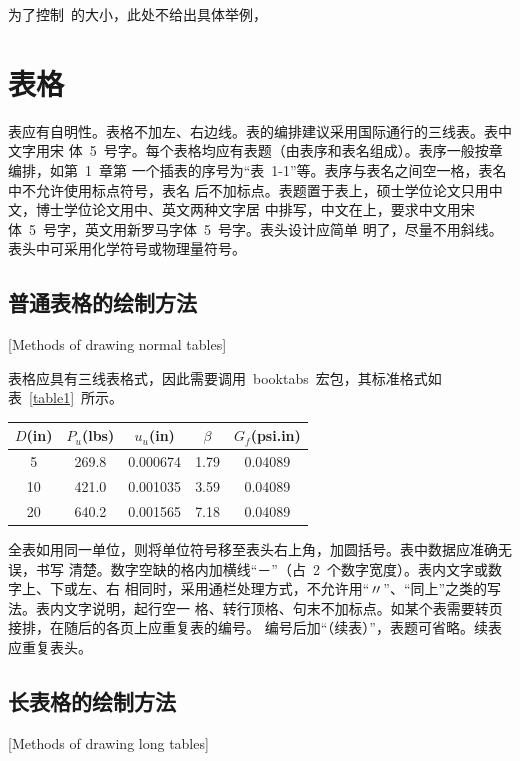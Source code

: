 为了控制\heuthesis\ 的大小，此处不给出具体举例，

\section{表格}

表应有自明性。表格不加左、右边线。表的编排建议采用国际通行的三线表。表中文字用宋
体~5~号字。每个表格均应有表题（由表序和表名组成）。表序一般按章编排，如第~1~章第
一个插表的序号为“表~1-1”等。表序与表名之间空一格，表名中不允许使用标点符号，表名
后不加标点。表题置于表上，硕士学位论文只用中文，博士学位论文用中、英文两种文字居
中排写，中文在上，要求中文用宋体~5~号字，英文用新罗马字体~5~号字。表头设计应简单
明了，尽量不用斜线。表头中可采用化学符号或物理量符号。


\subsection{普通表格的绘制方法}[Methods of drawing normal tables]

表格应具有三线表格式，因此需要调用~booktabs~宏包，其标准格式如表~\ref{table1}~所示。
\begin{table}[htbp]
\vspace{0.5em}\centering\wuhao
\begin{tabular}{ccccc}
\toprule[1.5pt]
$D$(in) & $P_u$(lbs) & $u_u$(in) & $\beta$ & $G_f$(psi.in)\\
\midrule[1pt]
 5 & 269.8 & 0.000674 & 1.79 & 0.04089\\
10 & 421.0 & 0.001035 & 3.59 & 0.04089\\
20 & 640.2 & 0.001565 & 7.18 & 0.04089\\
\bottomrule[1.5pt]
\end{tabular}
\end{table}
全表如用同一单位，则将单位符号移至表头右上角，加圆括号。表中数据应准确无误，书写
清楚。数字空缺的格内加横线“－”（占~2~个数字宽度）。表内文字或数字上、下或左、右
相同时，采用通栏处理方式，不允许用“〃”、“同上”之类的写法。表内文字说明，起行空一
格、转行顶格、句末不加标点。如某个表需要转页接排，在随后的各页上应重复表的编号。
编号后加“（续表）”，表题可省略。续表应重复表头。

\subsection{长表格的绘制方法}[Methods of drawing long tables]

